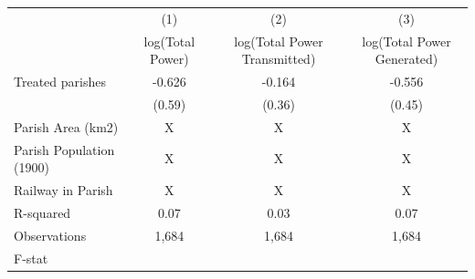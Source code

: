 {
\def\sym#1{\ifmmode^{#1}\else\(^{#1}\)\fi}
\begin{tabular}{l*{3}{c}}
\hline\hline
                    &\multicolumn{1}{c}{(1)}         &\multicolumn{1}{c}{(2)}         &\multicolumn{1}{c}{(3)}         \\
                    &log(Total Power)         &log(Total Power Transmitted)         &log(Total Power Generated)         \\
\hline
Treated parishes    &      -0.626         &      -0.164         &      -0.556         \\
                    &      (0.59)         &      (0.36)         &      (0.45)         \\
\hline
Parish Area (km2)   &           X         &           X         &           X         \\
Parish Population (1900)&           X         &           X         &           X         \\
Railway in Parish   &           X         &           X         &           X         \\
R-squared           &        0.07         &        0.03         &        0.07         \\
Observations        &       1,684         &       1,684         &       1,684         \\
F-stat              &                     &                     &                     \\
\hline\hline
\end{tabular}
}
